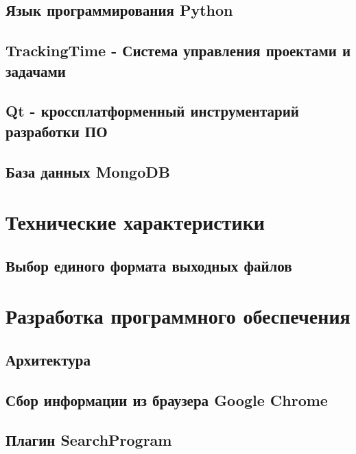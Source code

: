 \subsection{Язык программирования Python}

\subsection{TrackingTime - Система управления проектами и задачами}

\subsection{Qt - кроссплатформенный инструментарий разработки ПО}

\subsection{База данных MongoDB}


\section{Технические характеристики}

\subsection{Выбор единого формата выходных файлов}


\section{Разработка программного обеспечения}
\setcounter{figure}{0}
 
\subsection{Архитектура}


\newpage
\subsection{Сбор информации из браузера Google Chrome} %


\newpage
\subsection{Плагин SearchProgram} %


